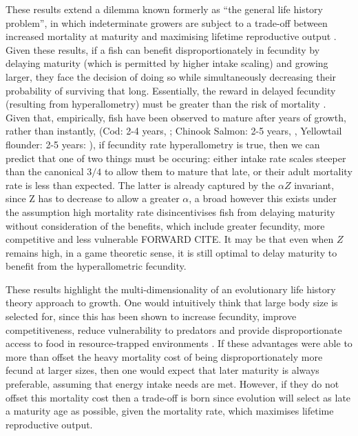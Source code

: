 \documentclass[a4paper]{article} %
\begin{document}
These results extend a dilemma known formerly as ``the general life history problem'', in which indeterminate growers are subject to a trade-off between increased mortality at maturity and maximising lifetime reproductive output \autocite{Roff2006, Stearns2000}. Given these results, if a fish can benefit disproportionately in fecundity by delaying maturity (which is permitted by higher intake scaling) and growing larger, they face the decision of doing so while simultaneously decreasing their probability of surviving that long. Essentially, the reward in delayed fecundity (resulting from hyperallometry) must be greater than the risk of mortality \autocite{Arendt2011}. Given that, empirically, fish have been observed to mature after years of growth, rather than instantly, (Cod: 2-4 years, \textcite{OBrien1993, Rochet2001, Knickle2013}; Chinook Salmon: 2-5 years, \textcite{groot1991pacific}, Yellowtail flounder: 2-5 years: \textcite{OBrien1993}), if fecundity rate hyperallometry is true, then we can predict that one of two things must be occuring: either intake rate scales steeper than the canonical $3/4$ to allow them to mature that late, or their adult mortality rate is less than expected. The latter is already captured by the $\alpha Z$ invariant, since Z has to decrease to allow a greater $\alpha$, a broad however this exists under the assumption high mortality rate disincentivises fish from delaying maturity without consideration of the benefits, which include greater fecundity, more competitive and less vulnerable \autocite{Arendt2011} FORWARD CITE. It may be that even when $Z$ remains high, in a game theoretic sense, it is still optimal to delay maturity to benefit from the hyperallometric fecundity.

These results highlight the multi-dimensionality of an evolutionary life history theory approach to growth. One would intuitively think that large body size is selected for, since this has been shown to increase fecundity, improve competitiveness, reduce vulnerability to predators and provide disproportionate access to food in resource-trapped environments \autocite{roff2002life, Oddie2000, French2005, Bashey2008, Magnhagen2001, Craig2006, Arendt2011, Pawar2012}. If these advantages were able to more than offset the heavy mortality cost of being disproportionately more fecund at larger sizes, then one would expect that later maturity is always preferable, assuming that energy intake needs are met. However, if they do not offset this mortality cost then a trade-off is born since evolution will select as late a maturity age as possible, given the mortality rate, which maximises lifetime reproductive output.
\end{document}
